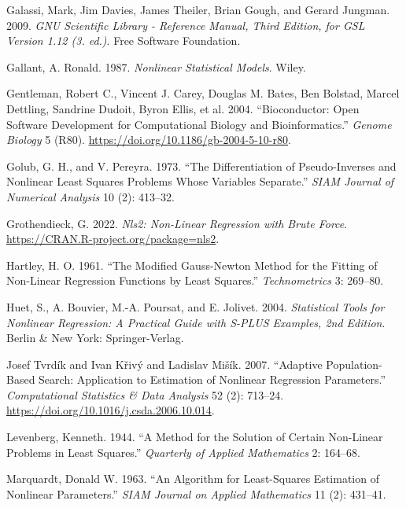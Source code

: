\begin{CSLReferences}{1}{0}
\leavevmode{}%
Galassi, Mark, Jim Davies, James Theiler, Brian Gough, and Gerard Jungman. 2009. \emph{{GNU Scientific Library - Reference Manual, Third Edition, for GSL Version 1.12 (3. ed.)}}. Free Software Foundation.

\leavevmode{}%
Gallant, A. Ronald. 1987. \emph{Nonlinear Statistical Models}. Wiley.

\leavevmode{}%
Gentleman, Robert C., Vincent J. Carey, Douglas M. Bates, Ben Bolstad, Marcel Dettling, Sandrine Dudoit, Byron Ellis, et al. 2004. {``Bioconductor: Open Software Development for Computational Biology and Bioinformatics.''} \emph{{Genome Biology}} 5 (R80). \url{https://doi.org/10.1186/gb-2004-5-10-r80}.

\leavevmode{}%
Golub, G. H., and V. Pereyra. 1973. {``The Differentiation of Pseudo-Inverses and Nonlinear Least Squares Problems Whose Variables Separate.''} \emph{SIAM Journal of Numerical Analysis} 10 (2): 413--32.

\leavevmode{}%
Grothendieck, G. 2022. \emph{Nls2: Non-Linear Regression with Brute Force}. \url{https://CRAN.R-project.org/package=nls2}.

\leavevmode{}%
Hartley, H. O. 1961. {``The Modified Gauss-Newton Method for the Fitting of Non-Linear Regression Functions by Least Squares.''} \emph{Technometrics} 3: 269--80.

\leavevmode{}%
Huet, S., A. Bouvier, M.-A. Poursat, and E. Jolivet. 2004. \emph{Statistical Tools for Nonlinear Regression: A Practical Guide with {S-PLUS} Examples, 2nd Edition}. Berlin \& New York: Springer-Verlag.

\leavevmode{}%
Josef Tvrdík and Ivan Křivý and Ladislav Mišík. 2007. {``Adaptive Population-Based Search: Application to Estimation of Nonlinear Regression Parameters.''} \emph{{Computational Statistics \& Data Analysis}} 52 (2): 713--24. \url{https://doi.org/10.1016/j.csda.2006.10.014}.

\leavevmode{}%
Levenberg, Kenneth. 1944. {``A Method for the Solution of Certain Non-Linear Problems in Least Squares.''} \emph{Quarterly of Applied Mathematics} 2: 164--68.

\leavevmode{}%
Marquardt, Donald W. 1963. {``{An Algorithm for Least-Squares Estimation of Nonlinear Parameters}.''} \emph{SIAM Journal on Applied Mathematics} 11 (2): 431--41.


\end{CSLReferences}
